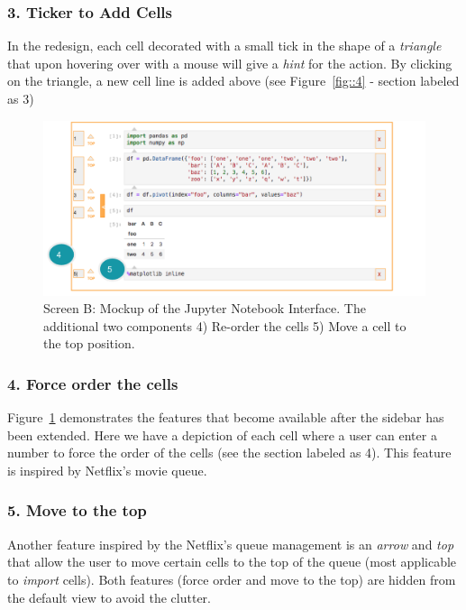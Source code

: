 \documentclass[12pt,letterpaper]{article}
\begin{document}
\subsubsection*{3. Ticker to Add Cells}
In the redesign, each cell decorated with a small tick in the shape of a \textit{triangle} that upon hovering over with a mouse will give a \textit{hint} for the action. By clicking on the triangle, a new cell line is added above (see Figure~\ref{fig::4} - section labeled as 3)

\begin{figure}[hbt!]
\centering
\includegraphics[scale=.6]{figures/project-principles/jupyter_mock_screen_b.png}
\caption{Screen B: Mockup of the Jupyter Notebook Interface. The additional two components 4) Re-order the cells 5) Move a cell to the top position.}
\label{fig::5}
\end{figure}

\subsubsection*{4. Force order the cells}
Figure~\ref{fig::5} demonstrates the features that become available after the sidebar has been extended. Here we have a depiction of each cell where a user can enter a number to force the order of the cells (see the section labeled as 4). This feature is inspired by Netflix's movie queue. 

\subsubsection*{5. Move to the top}
Another feature inspired by the Netflix's queue management is an \textit{arrow} and \textit{top} that allow the user to move certain cells to the top of the queue (most applicable to \textit{import} cells). Both features (force order and move to the top) are hidden from the default view to avoid the clutter.
\end{document}
